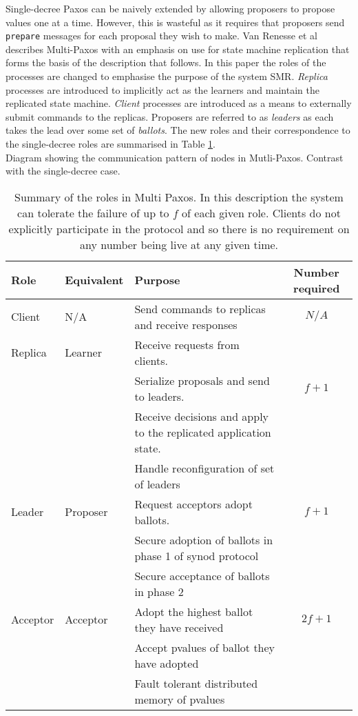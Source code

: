 Single-decree Paxos can be naively extended by allowing proposers to propose values one at a time. However, this is wasteful as it requires that proposers send \texttt{prepare} messages for each proposal they wish to make. Van Renesse et al \cite{VanRenesse:2015:PMM:2737799.2673577} describes Multi-Paxos with an emphasis on use for state machine replication that forms the basis of the description that follows. In this paper the roles of the processes are changed to emphasise the purpose of the system SMR. \emph{Replica} processes are introduced to implicitly act as the learners and maintain the replicated state machine. \emph{Client} processes are introduced as a means to externally submit commands to the replicas. Proposers are referred to as \emph{leaders} as each takes the lead over some set of \emph{ballots}. The new roles and their correspondence to the single-decree roles are summarised in Table \ref{table:multi-role-summary}. \\

{\color{blue}Diagram showing the communication pattern of nodes in Mutli-Paxos. Contrast with the single-decree case.}

\begin{table}
\centering
\begin{tabular}{ | l  | l | p{6cm} | c | } \hline
   \textbf{Role} & \textbf{Equivalent} & \textbf{Purpose} & \textbf{Number required} \\ \hline
   Client & N/A & Send commands to replicas and receive responses & $ N/A $ \\ \hline
  
   Replica & Learner & Receive requests from clients. &  \\
                 & & Serialize proposals and send to leaders. & $f + 1$ \\
                 & & Receive decisions and apply to the replicated application state. & \\
                 & & Handle reconfiguration of set of leaders & \\ \hline
  
  Leader & Proposer & Request acceptors adopt ballots. & $f + 1$ \\
               & & Secure adoption of ballots in phase 1 of synod protocol & \\
               & & Secure acceptance of ballots in phase 2 &  \\ \hline
               
  Acceptor & Acceptor & Adopt the highest ballot they have received & $2f + 1$ \\
                   & & Accept pvalues of ballot they have adopted & \\
                   & & Fault tolerant distributed memory of pvalues &  \\ \hline
\end{tabular}
\caption{Summary of the roles in Multi Paxos. In this description the system can tolerate the failure of up to $f$ of each given role. Clients do not explicitly participate in the protocol and so there is no requirement on any number being live at any given time.}
\label{table:multi-role-summary}
\end{table}

